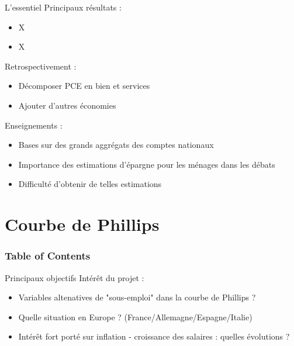 \documentclass[9pt, xcolor={dvipsnames}]{beamer}
\begin{document}
\begin{frame}{L'essentiel}
  Principaux résultats :
  \begin{itemize}
    \item X
    \item X
  \end{itemize}
  \vspace{.2cm}
  Retrospectivement :
  \begin{itemize}
    \item Décomposer PCE en bien et services
    \item Ajouter d'autres économies 
  \end{itemize}
  \vspace{.2cm}
  Enseignements :
  \begin{itemize}
    \item Bases sur des grands aggrégats des comptes nationaux
    \item Importance des estimations d'épargne pour les ménages dans les débats  
    \item Difficulté d'obtenir de telles estimations
  \end{itemize}
\end{frame}

\section{Courbe de Phillips}
\begin{frame}
  \frametitle{Table of Contents}
  \tableofcontents[currentsection]
\end{frame}

\begin{frame}{Principaux objectifs}
  Intérêt du projet :
  \begin{itemize}
    \item Variables altenatives de "sous-emploi" dans la courbe de Phillips ?
    \item Quelle situation en Europe ? (France/Allemagne/Espagne/Italie)
    \item Intérêt fort porté sur inflation - croissance des salaires : quelles évolutions ?
  \end{itemize}
\end{frame}
\end{document}
